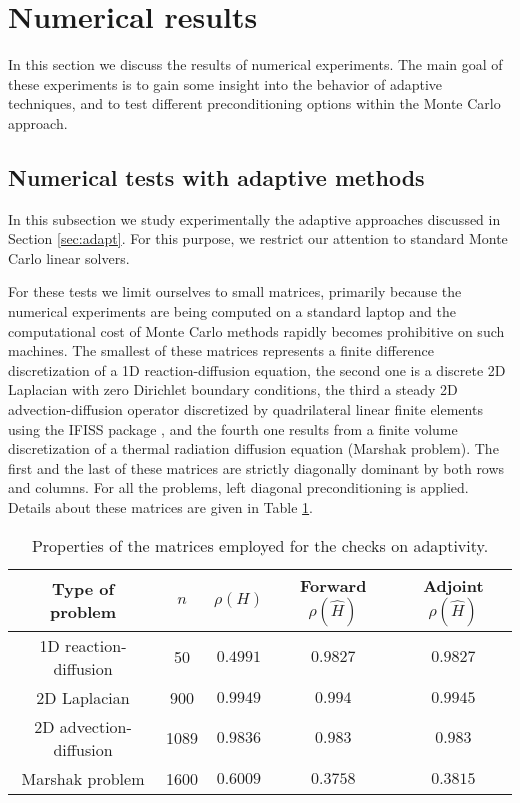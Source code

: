 \documentclass[final,leqno,onefignum,onetabnum]{siamltex1213}
\begin{document}
\section{Numerical results}
\label{sec:results}

In this section we discuss the results of numerical experiments. The main goal 
of these experiments is to gain some insight into the behavior of adaptive
techniques, and to test different preconditioning options within the 
Monte Carlo approach.

\subsection{Numerical tests with adaptive methods}

In this subsection we study experimentally the 
adaptive approaches discussed in Section \ref{sec:adapt}.  
For this purpose, we restrict our attention to standard Monte Carlo linear
solvers.

For these tests we limit ourselves
to small matrices, primarily because the numerical experiments are
being computed on a standard laptop and the computational cost of
Monte Carlo methods rapidly becomes prohibitive on such machines.
The smallest of these matrices represents a finite
difference discretization of a 1D reaction-diffusion equation, 
the second one is a discrete 2D Laplacian with zero Dirichlet boundary
conditions, the third a steady 2D advection-diffusion operator discretized
by quadrilateral linear finite elements using the IFISS package \cite{ifiss},
and the fourth one 
results from a finite volume discretization of
a thermal radiation diffusion equation (Marshak problem). The first and the last of these
matrices are strictly diagonally dominant by both rows and columns.
For all the problems, left diagonal preconditioning is applied.
Details about these matrices are given in Table
\ref{table_data}.

\begin{table}[!t]
\centering
\begin{tabular}{|c|c|c|c|c|}
\hline
\textbf{Type of problem} & $n$ &
$\rho(H)$&Forward $\rho(\hat{H})$&Adjoint $\rho(\hat{H})$\\
\hline
1D reaction-diffusion & 50 & $0.4991$ & $0.9827$ & $0.9827$\\
\hline
2D Laplacian & 900 & $0.9949$ & $0.994$ & $0.9945$\\
\hline
2D advection-diffusion & 1089 &$0.9836$ & $0.983$ & $0.983$ \\
\hline
Marshak problem & 1600 & $0.6009$ & $0.3758$ & $ 0.3815$ \\
\hline
\end{tabular}
\caption{Properties of the matrices employed for the checks on adaptivity.}
\label{table_data}
\end{table}
\end{document}

